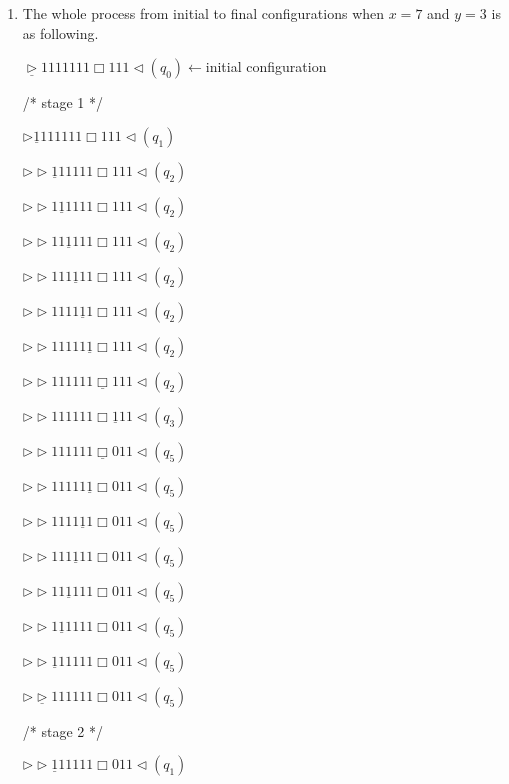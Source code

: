 \documentclass[12pt,a4paper]{article}
\makeatletter
\newtheorem*{solution}{Solution}
\theoremstyle{definition}
\renewenvironment{solution}[1][Solution] {\par\pushQED{\qed}\normalfont\topsep6\p@\@plus6\p@\relax\trivlist\item[\hskip\labelsep\bfseries#1\@addpunct{.}]\ignorespaces}{\popQED\endtrivlist\@endpefalse} \makeatother
\makeatother
\begin{document}
\begin{enumerate}
\begin{solution}
	The whole process from initial to final configurations when $x = 7$ and $y = 3$ is as following.
	
	$\underline{\triangleright}1111111\Box111\triangleleft(q_0)\leftarrow$initial configuration
	
	\begin{minipage}{0.3\textwidth}
		\centering
		/* stage 1 */
		
		$\triangleright\underline{1}111111\Box111\triangleleft(q_1)$
		
		$\triangleright\triangleright\underline{1}11111\Box111\triangleleft(q_2)$
		
		$\triangleright\triangleright1\underline{1}1111\Box111\triangleleft(q_2)$
		
		$\triangleright\triangleright11\underline{1}111\Box111\triangleleft(q_2)$
		
		$\triangleright\triangleright111\underline{1}11\Box111\triangleleft(q_2)$
		
		$\triangleright\triangleright1111\underline{1}1\Box111\triangleleft(q_2)$
		
		$\triangleright\triangleright11111\underline{1}\Box111\triangleleft(q_2)$
		
		$\triangleright\triangleright111111\underline{\Box}111\triangleleft(q_2)$
		
		$\triangleright\triangleright111111\Box\underline{1}11\triangleleft(q_3)$
		
		$\triangleright\triangleright111111\underline{\Box}011\triangleleft(q_5)$
		
		$\triangleright\triangleright11111\underline{1}\Box011\triangleleft(q_5)$
		
		$\triangleright\triangleright1111\underline{1}1\Box011\triangleleft(q_5)$
		
		$\triangleright\triangleright111\underline{1}11\Box011\triangleleft(q_5)$
		
		$\triangleright\triangleright11\underline{1}111\Box011\triangleleft(q_5)$
		
		$\triangleright\triangleright1\underline{1}1111\Box011\triangleleft(q_5)$
		
		$\triangleright\triangleright\underline{1}11111\Box011\triangleleft(q_5)$
		
		$\triangleright\underline{\triangleright}111111\Box011\triangleleft(q_5)$
		
		\quad
		
		/* stage 2 */
		
		$\triangleright\triangleright\underline{1}11111\Box011\triangleleft(q_1)$
		

\end{minipage}
\end{solution}
\end{enumerate}
\end{document}
